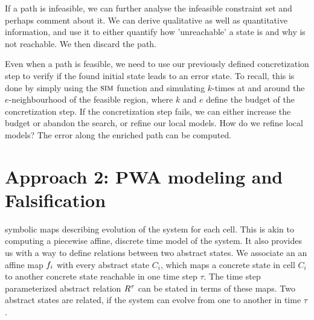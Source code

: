 If a path is infeasible, we can further analyse the infeasible
constraint set and perhaps comment about it. We can derive
qualitative as well as quantitative information, and use it to either
quantify how 'unreachable' a state is and why is not reachable. We
then discard the path.




Even when a path is feasible, we need to use our previously defined
concretization step to verify if the found initial state leads to an
error state. To recall, this is done by simply using the $\mbox{\sc sim}$
function and simulating $k$-times at and around the $e$-neighbourhood
of the feasible region, where $k$ and $e$ define the budget of the
concretization step. If the concretization step fails, we can either
increase the budget or abandon the search, or refine our local models.
How do we refine local models? The error along the enriched path can
be computed. %



\section{Approach 2: PWA modeling and Falsification}

symbolic maps describing evolution of the system for each cell. This
is akin to computing a piecewise affine, discrete time model of the
system. It also provides us with a way to define relations between two
abstract states. We associate an an affine map $f_{i}$ with every
abstract state $C_i$, which maps a concrete state in cell $C_i$ to
another concrete state reachable in one time step $\tau$. The time
step parameterized abstract relation $R^{\tau}$ can be stated in
terms of these maps. Two abstract states are related, if the system
can evolve from one to another in time $\tau$.

